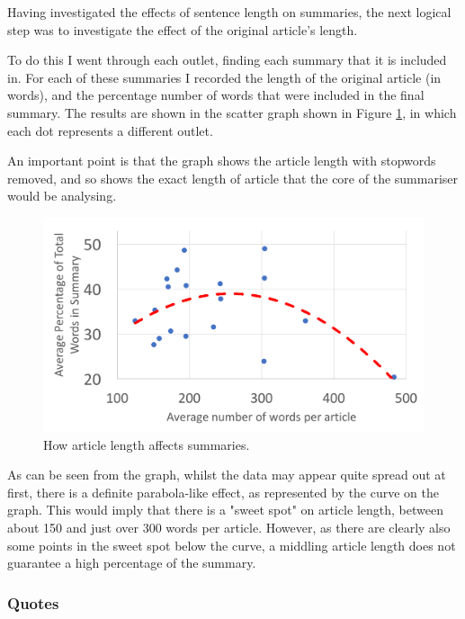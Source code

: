 \documentclass[12pt]{article}
\begin{document}
Having investigated the effects of sentence length on summaries, the next logical step was to investigate the effect of the original article's length.

To do this I went through each outlet, finding each summary that it is included in. For each of these summaries I recorded the length of the original article (in words), and the percentage number of words that were included in the final summary. The results are shown in the scatter graph shown in Figure \ref{articlelength}, in which each dot represents a different outlet.

An important point is that the graph shows the article length with stopwords removed, and so shows the exact length of article that the core of the summariser would be analysing.

\begin{figure}[ht!]
  \centering
    \includegraphics[scale=0.6]{articlelength.png}
   \caption[A graph depicting responses to the User Interface Survey]{How article length affects summaries.}
   \label{articlelength}
\end{figure}

As can be seen from the graph, whilst the data may appear quite spread out at first, there is a definite parabola-like effect, as represented by the curve on the graph. This would imply that there is a "sweet spot" on article length, between about 150 and just over 300 words per article. However, as there are clearly also some points in the sweet spot below the curve, a middling article length does not guarantee a high percentage of the summary.

\subsubsection{Quotes}
\end{document}
